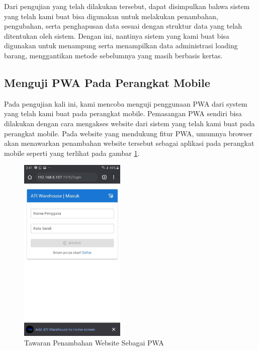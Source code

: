 Dari pengujian yang telah dilakukan tersebut, dapat disimpulkan bahwa sistem yang telah kami buat bisa digunakan untuk melakukan penambahan, pengubahan, serta penghapusan data sesuai dengan struktur data yang telah ditentukan oleh sistem.
Dengan ini, nantinya sistem yang kami buat bisa digunakan untuk menampung serta menampilkan data administrasi loading barang, menggantikan metode sebelumnya yang masih berbasis kertas.
\vspace{0.5ex}

\subsection{Menguji PWA Pada Perangkat Mobile}
\vspace{1ex}

Pada pengujian kali ini, kami mencoba menguji penggunaan PWA dari system yang telah kami buat pada perangkat mobile.
Pemasangan PWA sendiri bisa dilakukan dengan cara mengakses website dari sistem yang telah kami buat pada perangkat mobile.
Pada website yang mendukung fitur PWA, umumnya browser akan menawarkan penambahan website tersebut sebagai aplikasi pada perangkat mobile seperti yang terlihat pada gambar \ref{fig:pasangPwa}.
\vspace{0.5ex}

\begin{figure} [ht!] \centering
  \includegraphics[width=0.45\textwidth]{gambar/pasang-pwa.jpg}
  \caption{Tawaran Penambahan Website Sebagai PWA}
  \label{fig:pasangPwa}
\end{figure}

